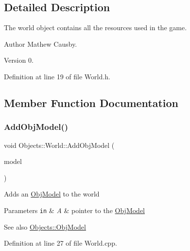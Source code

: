 \subsection{Detailed Description}
The world object contains all the resources used in the game. \begin{DoxyAuthor}{Author}
Mathew Causby. 
\end{DoxyAuthor}
\begin{DoxyVersion}{Version}
0. 
\end{DoxyVersion}


Definition at line 19 of file World.\+h.



\subsection{Member Function Documentation}
\mbox{\label{class_objects_1_1_world_ad84eb295fb787e7217237e27560f1e41}} 
\subsubsection{\texorpdfstring{Add\+Obj\+Model()}{AddObjModel()}}
{\footnotesize\ttfamily void Objects\+::\+World\+::\+Add\+Obj\+Model (\begin{DoxyParamCaption}\item[{std\+::shared\+\_\+ptr$<$ \hyperlink{class_objects_1_1_obj_model}{Obj\+Model} $>$}]{model }\end{DoxyParamCaption})}

Adds an \hyperlink{class_objects_1_1_obj_model}{Obj\+Model} to the world 
\begin{DoxyParams}[1]{Parameters}
\mbox{\tt in}  & {\em A} & pointer to the \hyperlink{class_objects_1_1_obj_model}{Obj\+Model} \\
\hline
\end{DoxyParams}
\begin{DoxySeeAlso}{See also}
\hyperlink{class_objects_1_1_obj_model}{Objects\+::\+Obj\+Model} 
\end{DoxySeeAlso}


Definition at line 27 of file World.\+cpp.

\mbox{\label{class_objects_1_1_world_a8512010f2e623aafdeb68b86fc8a5efa}} 
